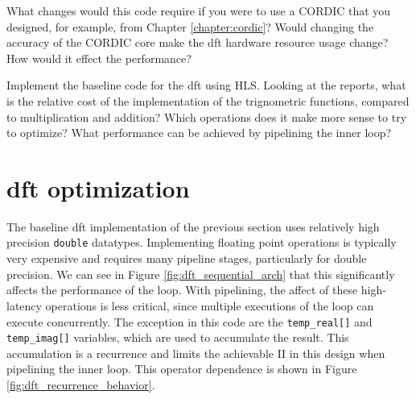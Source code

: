 
\begin{exercise}
What changes would this code require if you were to use a CORDIC that you designed, for example, from Chapter \ref{chapter:cordic}? Would changing the accuracy of the CORDIC core make the \gls{dft} hardware resource usage change? How would it effect the performance? 
\end{exercise}

\begin{exercise}
Implement the baseline code for the \gls{dft} using HLS.  Looking at the reports, what is the relative cost of the implementation of the trignometric functions, compared to multiplication and addition?  Which operations does it make more sense to try to optimize?  What performance can be achieved by pipelining the inner loop?
\end{exercise}

\section{\gls{dft} optimization}
\label{subsec:dft_optimization}

The baseline \gls{dft} implementation of the previous section uses relatively high precision \lstinline|double| datatypes.  Implementing floating point operations is typically very expensive and requires many pipeline stages, particularly for double precision.  We can see in Figure \ref{fig:dft_sequential_arch} that this significantly affects the performance of the loop.  With pipelining, the affect of these high-latency operations is less critical, since multiple executions of the loop can execute concurrently.  The exception in this code are the \lstinline|temp_real[]| and \lstinline|temp_imag[]| variables, which are used to accumulate the result.  This accumulation is a \gls{recurrence} and limits the achievable II in this design when pipelining the inner loop.   This operator dependence is shown in Figure \ref{fig:dft_recurrence_behavior}.

